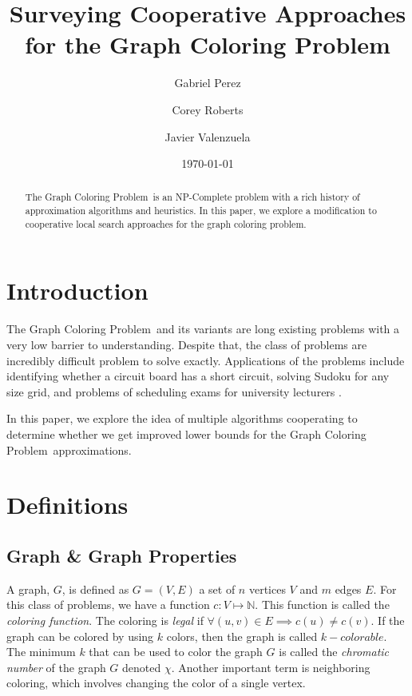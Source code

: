 \documentclass[runningheads]{llncs}
\title{Surveying Cooperative Approaches for the Graph Coloring Problem}
\author{Gabriel Perez
\and
Corey Roberts
\and
Javier Valenzuela
}
\date{\today}
\institute{ Department of Electrical and Computer  Engineering\\
  University of Texas at Austin,\\
  Austin, TX 78712\\
 \email{\{email1, email2\}@utexas.edu}}
\newcommand{\GCP}{{Graph Coloring Problem}\ }
\begin{document}
\def\IEEEQED{\mbox{\rule[0pt]{1.3ex}{1.3ex}}} %
\newcommand{\ep}{\hspace*{\fill}~\IEEEQED}
\newenvironment{mproof}[1][Proof]{{\bf #1: }}{\ep\vspace{.1in}}

\maketitle
\doublespacing

\begin{abstract}
The \GCP is an NP-Complete problem with a rich history of approximation algorithms and heuristics. In this paper, we explore a modification to cooperative local search approaches for the graph coloring problem.
\end{abstract}

\section{Introduction}
The \GCP and its variants are long existing problems with a very low barrier to understanding. Despite that, the class of problems are incredibly difficult problem to solve exactly. Applications of the problems include identifying whether a circuit board has a short circuit, solving Sudoku for any size grid, and problems of scheduling exams for university lecturers \cite{10.5555/2851123}.

In this paper, we explore the idea of multiple algorithms cooperating to determine whether we get improved lower bounds for the \GCP approximations.

\section{Definitions}

\subsection{Graph \& Graph Properties}

A graph, $G$, is defined as $G = (V, E)$ a set of $n$ vertices $V$ and $m$ edges $E$. For this class of problems, we have a function $c: V \mapsto \mathbb{N} $. This function is called the \emph{coloring function}. The coloring is \emph{legal} if $\forall (u, v) \in E \implies c(u) \ne c(v)$. If the graph can be colored by using $k$ colors, then the graph is called $k-colorable$. The minimum $k$ that can be used to color the graph $G$ is called the \emph{chromatic number} of the graph $G$ denoted $\chi$. Another important term is neighboring coloring, which involves changing the color of a single vertex.
\end{document}
